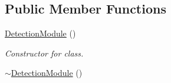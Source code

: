 \subsection*{Public Member Functions}
\begin{DoxyCompactItemize}
\item 
\hyperlink{classDetectionModule_a4932f860fdbd74d8e6c05a7d8c38663b}{Detection\+Module} ()\hypertarget{classDetectionModule_a4932f860fdbd74d8e6c05a7d8c38663b}{}\label{classDetectionModule_a4932f860fdbd74d8e6c05a7d8c38663b}

\begin{DoxyCompactList}\small\item\em Constructor for class. \end{DoxyCompactList}\item 
\hyperlink{classDetectionModule_aead68009e498043dcfb41549c8bc9b12}{$\sim$\+Detection\+Module} ()\hypertarget{classDetectionModule_aead68009e498043dcfb41549c8bc9b12}{}\label{classDetectionModule_aead68009e498043dcfb41549c8bc9b12}


\end{DoxyCompactItemize}
